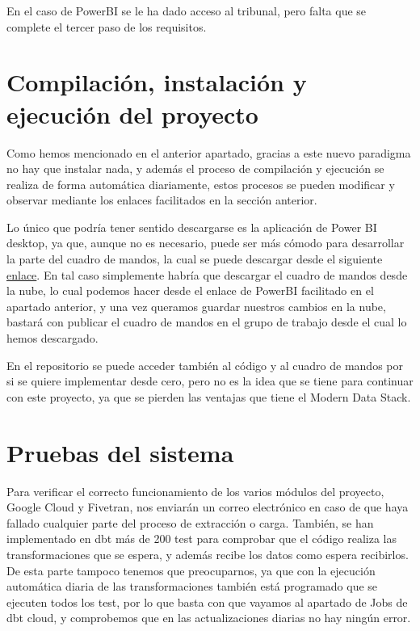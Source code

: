 En el caso de PowerBI se le ha dado acceso al tribunal, pero falta que se complete el tercer paso de los requisitos.

\section{Compilación, instalación y ejecución del proyecto}

Como hemos mencionado en el anterior apartado, gracias a este nuevo paradigma no hay que instalar nada, y además el proceso de compilación y ejecución se realiza de forma automática diariamente, estos procesos se pueden modificar y observar mediante los enlaces facilitados en la sección anterior. 

Lo único que podría tener sentido descargarse es la aplicación de Power BI desktop, ya que, aunque no es necesario, puede ser más cómodo para desarrollar la parte del cuadro de mandos, la cual se puede descargar desde el siguiente \href{https://powerbi.microsoft.com/es-es/downloads/}{enlace}. En tal caso simplemente habría que descargar el cuadro de mandos desde la nube, lo cual podemos hacer desde el enlace de PowerBI facilitado en el apartado anterior, y una vez queramos guardar nuestros cambios en la nube, bastará con publicar el cuadro de mandos en el grupo de trabajo desde el cual lo hemos descargado.

En el repositorio se puede acceder también al código y al cuadro de mandos por si se quiere implementar desde cero, pero no es la idea que se tiene para continuar con este proyecto, ya que se pierden las ventajas que tiene el Modern Data Stack.

\section{Pruebas del sistema}

Para verificar el correcto funcionamiento de los varios módulos del proyecto, Google Cloud y Fivetran, nos enviarán un correo electrónico en caso de que haya fallado cualquier parte del proceso de extracción o carga. También, se han implementado en dbt más de 200 test para comprobar que el código realiza las transformaciones que se espera, y además recibe los datos como espera recibirlos. De esta parte tampoco tenemos que preocuparnos, ya que con la ejecución automática diaria de las transformaciones también está programado que se ejecuten todos los test, por lo que basta con que vayamos al apartado de Jobs de dbt cloud, y comprobemos que en las actualizaciones diarias no hay ningún error.
